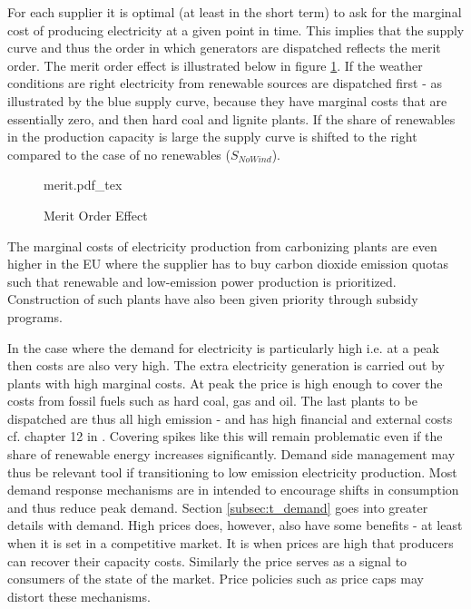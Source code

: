 For each supplier it is optimal (at least in the short term) to ask for the marginal cost of producing electricity at a given point in time. This implies that the supply curve and thus the order in which generators are dispatched reflects the merit order. The merit order effect is illustrated below in figure \ref{fig:merit}. If the weather conditions are right electricity from renewable sources are dispatched first - as illustrated by the blue supply curve, because they have marginal costs that are essentially zero, and then hard coal and lignite plants. If the share of renewables in the production capacity is large the supply curve is shifted to the right compared to the case of no renewables ($S_{NoWind}$).
\medskip 
\begin{figure}[H]
    \centering
    \caption{Merit Order Effect}
    \label{fig:merit}
    \center
        \def\svgwidth{0.9\textwidth}
        {merit.pdf_tex}
\end{figure}

\noindent The marginal costs of electricity production from carbonizing plants are even higher in the EU where the supplier has to buy carbon dioxide emission quotas such that renewable and low-emission power production is prioritized. Construction of such plants have also been given priority through subsidy programs. 
\medskip

In the case where the demand for electricity is particularly high i.e. at a peak then costs are also very high. The extra electricity generation is carried out by plants with high marginal costs. At peak the price is high enough to cover the costs from fossil fuels such as hard coal, gas and oil. The last plants to be dispatched are thus all high emission - and has high financial and external costs cf. chapter 12 in \citet{zweifel2017energy}. Covering spikes like this will remain problematic even if the share of renewable energy increases significantly. Demand side management may thus be relevant tool if transitioning to low emission electricity production. Most demand response mechanisms are in intended to encourage shifts in consumption and thus reduce peak demand. Section \ref{subsec:t_demand} goes into greater details with demand. High prices does, however, also have some benefits - at least when it is set in a competitive market. It is when prices are high that producers can recover their capacity costs. Similarly the price serves as a signal to consumers of the state of the market. Price policies such as price caps may distort these mechanisms. 

